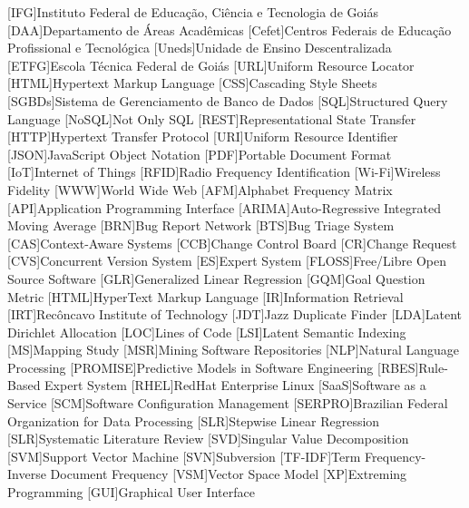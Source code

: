 \begin{acronym}[ACRONYM] 
[IFG]{Instituto Federal de Educação, Ciência e Tecnologia de Goiás}
[DAA]{Departamento de Áreas Acadêmicas}
[Cefet]{Centros Federais de Educação Profissional e Tecnológica}
[Uneds]{Unidade de Ensino Descentralizada}
[ETFG]{Escola Técnica Federal de Goiás}
[URL]{Uniform Resource Locator}
[HTML]{Hypertext Markup Language}
[CSS]{Cascading Style Sheets}
[SGBDs]{Sistema de Gerenciamento de Banco de Dados}
[SQL]{Structured Query Language}
[NoSQL]{Not Only SQL}
[REST]{Representational State Transfer}
[HTTP]{Hypertext Transfer Protocol}
[URI]{Uniform Resource Identifier}
[JSON]{JavaScript Object Notation}
[PDF]{Portable Document Format}
[IoT]{Internet of Things}
[RFID]{Radio Frequency Identification}
[Wi-Fi]{Wireless Fidelity}
[WWW]{World Wide Web}
[AFM]{Alphabet Frequency Matrix}
[API]{Application Programming Interface}
[ARIMA]{Auto-Regressive Integrated Moving Average}
[BRN]{Bug Report Network}
[BTS]{Bug Triage System}
[CAS]{Context-Aware Systems}
[CCB]{Change Control Board}
[CR]{Change Request}
[CVS]{Concurrent Version System}
[ES]{Expert System}
[FLOSS]{Free/Libre Open Source Software}
[GLR]{Generalized Linear Regression}
[GQM]{Goal Question Metric}
[HTML]{HyperText Markup Language}
[IR]{Information Retrieval}
[IRT]{Recôncavo Institute of Technology}
[JDT]{Jazz Duplicate Finder}
[LDA]{Latent Dirichlet Allocation}
[LOC]{Lines of Code}
[LSI]{Latent Semantic Indexing}
[MS]{Mapping Study}
[MSR]{Mining Software Repositories}
[NLP]{Natural Language Processing}
[PROMISE]{Predictive Models in Software Engineering}
[RBES]{Rule-Based Expert System}
[RHEL]{RedHat Enterprise Linux}
[SaaS]{Software as a Service}
[SCM]{Software Configuration Management}
[SERPRO]{Brazilian Federal Organization for Data Processing}
[SLR]{Stepwise Linear Regression}
[SLR]{Systematic Literature Review}
[SVD]{Singular Value Decomposition}
[SVM]{Support Vector Machine}
[SVN]{Subversion}
[TF-IDF]{Term Frequency-Inverse Document Frequency}
[VSM]{Vector Space Model}
[XP]{Extreming Programming}
[GUI]{Graphical User Interface}
\end{acronym}